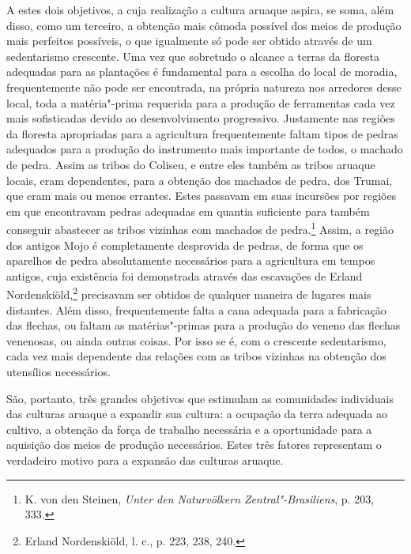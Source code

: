 A estes dois objetivos, a cuja realização a cultura aruaque aspira, se
soma, além disso, como um terceiro, a obtenção mais cômoda possível dos
meios de produção mais perfeitos possíveis, o que igualmente só pode
ser obtido através de um sedentarismo crescente. Uma vez que sobretudo
o alcance a terras da floresta adequadas para as plantações é
fundamental para a escolha do local de moradia, frequentemente não pode
ser encontrada, na própria natureza nos arredores desse local, toda a
matéria"-prima requerida para a produção de ferramentas cada vez mais
sofisticadas devido ao desenvolvimento progressivo. Justamente nas
regiões da floresta apropriadas para a agricultura frequentemente
faltam tipos de pedras adequados para a produção do instrumento mais
importante de todos, o machado de pedra. Assim as tribos do Coliseu, e
entre eles também as tribos aruaque locais, eram dependentes, para a
obtenção dos machados de pedra, dos Trumai, que eram mais ou menos
errantes. Estes passavam em suas incursões por regiões em que
encontravam pedras adequadas em quantia suficiente para também conseguir
abastecer as tribos vizinhas com machados de pedra.\footnote{K. von den
  Steinen, \emph{Unter den Naturvölkern Zentral"-Brasiliens}, p. 203,
  333.} Assim, a região dos antigos Mojo é completamente desprovida de
pedras, de forma que os aparelhos de pedra absolutamente necessários
para a agricultura em tempos antigos, cuja existência foi demonstrada
através das escavações de Erland Nordenskiöld,\footnote{Erland
  Nordenskiöld, l. c., p. 223, 238, 240.} precisavam ser obtidos de
qualquer maneira de lugares mais distantes. Além disso, frequentemente
falta a cana adequada para a fabricação das flechas, ou faltam as
matérias"-primas para a produção do veneno das flechas venenosas, ou
ainda outras coisas. Por isso se é, com o crescente sedentarismo, cada
vez mais dependente das relações com as tribos vizinhas na obtenção dos
utensílios necessários.

São, portanto, três grandes objetivos que estimulam as comunidades
individuais das culturas aruaque a expandir sua cultura: a ocupação da
terra adequada ao cultivo, a obtenção da força de trabalho necessária e
a oportunidade para a aquisição dos meios de produção necessários. Estes
três fatores representam o verdadeiro motivo para a expansão das
culturas aruaque.

